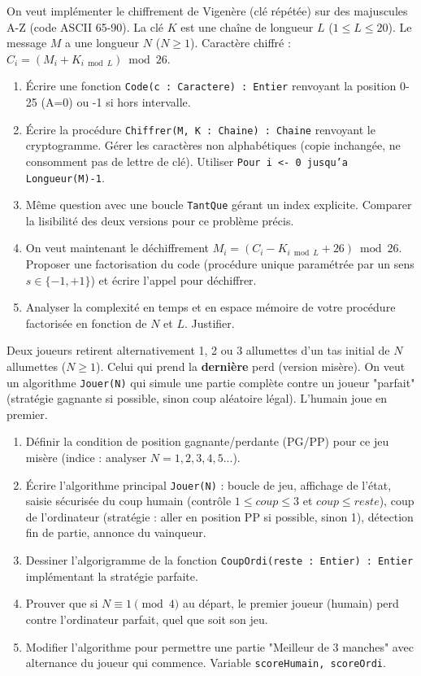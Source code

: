 \documentclass[11pt]{article}
\begin{document}
\begin{exercice}
On veut implémenter le chiffrement de Vigenère (clé répétée) sur des majuscules A-Z (code ASCII 65-90). La clé $K$ est une chaîne de longueur $L$ ($1 \le L \le 20$). Le message $M$ a une longueur $N$ ($N \ge 1$). Caractère chiffré : $C_i = (M_i + K_{i \bmod L}) \bmod 26$.
\begin{enumerate}
    \item Écrire une fonction \texttt{Code(c : Caractere) : Entier} renvoyant la position 0-25 (A=0) ou -1 si hors intervalle.
    \item Écrire la procédure \texttt{Chiffrer(M, K : Chaine) : Chaine} renvoyant le cryptogramme. Gérer les caractères non alphabétiques (copie inchangée, ne consomment pas de lettre de clé). Utiliser \texttt{Pour i <- 0 jusqu'a Longueur(M)-1}.
    \item Même question avec une boucle \texttt{TantQue} gérant un index explicite. Comparer la lisibilité des deux versions pour ce problème précis.
    \item On veut maintenant le déchiffrement $M_i = (C_i - K_{i \bmod L} + 26) \bmod 26$. Proposer une factorisation du code (procédure unique paramétrée par un sens $s \in \{-1, +1\}$) et écrire l'appel pour déchiffrer.
    \item Analyser la complexité en temps et en espace mémoire de votre procédure factorisée en fonction de $N$ et $L$. Justifier.
\end{enumerate}
\end{exercice}

\begin{exercice}
Deux joueurs retirent alternativement 1, 2 ou 3 allumettes d'un tas initial de $N$ allumettes ($N \ge 1$). Celui qui prend la \textbf{dernière} perd (version misère). On veut un algorithme \texttt{Jouer(N)} qui simule une partie complète contre un joueur "parfait" (stratégie gagnante si possible, sinon coup aléatoire légal). L'humain joue en premier.
\begin{enumerate}
    \item Définir la condition de position gagnante/perdante (PG/PP) pour ce jeu misère (indice : analyser $N=1, 2, 3, 4, 5...$).
    \item Écrire l'algorithme principal \texttt{Jouer(N)} : boucle de jeu, affichage de l'état, saisie sécurisée du coup humain (contrôle $1 \le coup \le 3$ et $coup \le reste$), coup de l'ordinateur (stratégie : aller en position PP si possible, sinon 1), détection fin de partie, annonce du vainqueur.
    \item Dessiner l'algorigramme de la fonction \texttt{CoupOrdi(reste : Entier) : Entier} implémentant la stratégie parfaite.
    \item Prouver que si $N \equiv 1 \pmod 4$ au départ, le premier joueur (humain) perd contre l'ordinateur parfait, quel que soit son jeu.
    \item Modifier l'algorithme pour permettre une partie "Meilleur de 3 manches" avec alternance du joueur qui commence. Variable \texttt{scoreHumain, scoreOrdi}.
\end{enumerate}
\end{exercice}
\end{document}
